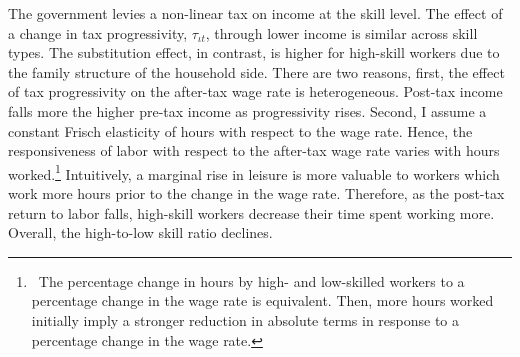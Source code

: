 The government levies a non-linear tax on income at the skill level. 
The effect of a change in tax progressivity, $\tau_{\iota t}$, through lower income is similar across skill types. The substitution effect, in contrast, is higher for high-skill workers due to the family structure of the household side.
There are two reasons, first, the effect of tax progressivity on the after-tax wage rate is heterogeneous. Post-tax income falls more the higher pre-tax income as progressivity rises. 
Second, I assume a constant Frisch elasticity of hours with respect to the wage rate. Hence, the responsiveness of labor with respect to the after-tax wage rate varies with hours worked.\footnote{\ The percentage change in hours by high- and low-skilled workers to a percentage change in the wage rate is equivalent. Then, more hours worked initially imply a stronger reduction in absolute terms in response to a percentage change in the wage rate. }
Intuitively, a marginal rise in leisure is more valuable to workers which work more hours prior to the change in the wage rate. Therefore, as the post-tax return to labor falls, high-skill workers decrease their time spent working more.
Overall, the high-to-low skill ratio declines. 


